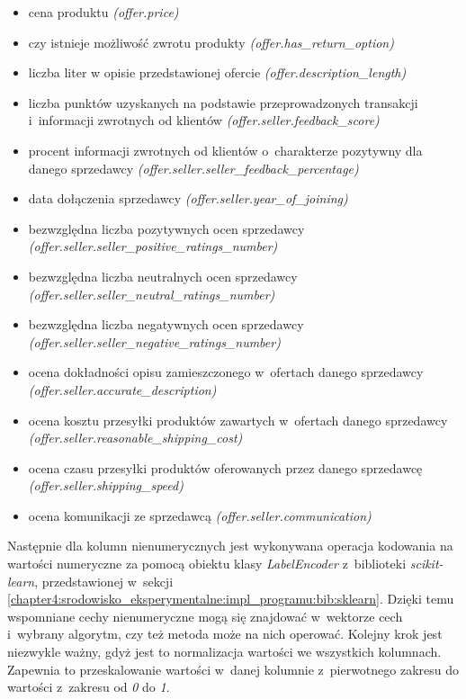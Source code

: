 \documentclass[../Kamil_Kowalewski_Main.tex]{subfiles}
\begin{document}
{{    %
        \begin{itemize}[noitemsep,topsep=1pt]
            \item cena produktu \textit{(offer.price)}
            \item czy istnieje możliwość zwrotu produkty \textit{(offer.has\_return\_option)}
            \item liczba liter w opisie przedstawionej ofercie
            \textit{(offer.description\_length)}
            \item liczba punktów uzyskanych na podstawie przeprowadzonych transakcji
            i~informacji zwrotnych od klientów \textit{(offer.seller.feedback\_score)}
            \item procent informacji zwrotnych od klientów o~charakterze pozytywny dla
            danego sprzedawcy \textit{(offer.seller.seller\_feedback\_percentage)}
            \item data dołączenia sprzedawcy \textit{(offer.seller.year\_of\_joining)}
            \item bezwzględna liczba pozytywnych ocen sprzedawcy
            \textit{(offer.seller.seller\_positive\_ratings\_number)}
            \item bezwzględna liczba neutralnych ocen sprzedawcy
            \textit{(offer.seller.seller\_neutral\_ratings\_number)}
            \item bezwzględna liczba negatywnych ocen sprzedawcy
            \textit{(offer.seller.seller\_negative\_ratings\_number)}
            \item ocena dokładności opisu zamieszczonego w~ofertach danego sprzedawcy
            \textit{(offer.seller.accurate\_description)}
            \item ocena kosztu przesyłki produktów zawartych w~ofertach danego
            sprzedawcy \textit{(offer.seller.reasonable\_shipping\_cost)}
            \item ocena czasu przesyłki produktów oferowanych przez danego sprzedawcę
            \textit{(offer.seller.shipping\_speed)}
            \item ocena komunikacji ze sprzedawcą \textit{(offer.seller.communication)}
        \end{itemize}
        \bigskip

        Następnie dla kolumn nienumerycznych jest wykonywana operacja kodowania na
        wartości numeryczne za pomocą obiektu klasy \textit{LabelEncoder} z~biblioteki
        \textit{scikit-learn}, przedstawionej w~sekcji
        \ref{chapter4:srodowisko_eksperymentalne:impl_programu:bib:sklearn}. Dzięki
        temu wspomniane cechy nienumeryczne mogą się znajdować w~wektorze cech
        i~wybrany algorytm, czy też metoda może na nich operować. Kolejny krok jest
        niezwykle ważny, gdyż jest to normalizacja wartości we wszystkich kolumnach.
        Zapewnia to przeskalowanie wartości w~danej kolumnie z~pierwotnego zakresu do
        wartości z~zakresu od \textit{0} do \textit{1}.

}}
\end{document}
